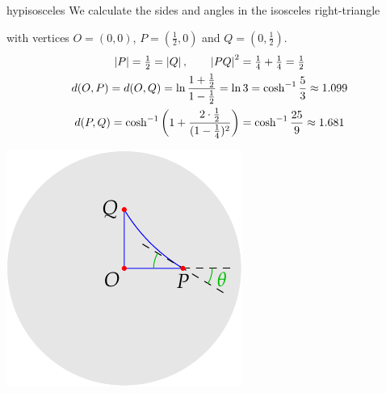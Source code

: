 \begin{example}{}{hypisosceles}
	We calculate the sides and angles in the isosceles right-triangle\par
	\begin{minipage}[t]{0.69\linewidth}\vspace{-8pt}
		with vertices $O=(0,0)$, $P=(\frac 12,0)$ and $Q=(0,\frac 12)$.
		\begin{gather*}
		\left| P\right|=\tfrac 12=\left| Q\right|,\qquad \left| PQ\right|^2=\tfrac 14+\tfrac 14=\tfrac 12\\
		d(O,P)=d(O,Q)=\ln\frac{1+\frac 12}{1-\frac 12}=\ln 3=\cosh^{-1}\frac 53\approx 1.099\\
		d(P,Q)=\cosh^{-1}\left(1+\frac{2\cdot \frac 12}{(1-\frac 14)^2}\right) =\cosh^{-1}\frac{25}9 \approx 1.681
		\end{gather*}
	\end{minipage}
	\hfill
	\begin{minipage}[t]{0.3\linewidth}\vspace{-20pt}
		\flushright\includegraphics[scale=0.9]{models-dist4}
	\end{minipage}
	\goodbreak
	

\end{example}
